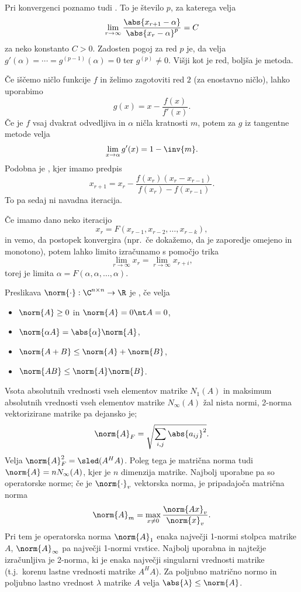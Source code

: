 Pri konvergenci poznamo tudi .
To je število $p$, za katerega velja
\[
  \lim_{r \to \infty} \frac{\abs{x_{r+1} - \alpha}}{\abs{x_r - \alpha}^{p}} = C
\]
za neko konstanto $C > 0$.
Zadosten pogoj za red $p$ je, da velja $g'(\alpha) = \cdots = g^{(p-1)}(\alpha)
= 0$ ter $g^{(p)} \ne 0$.
Višji kot je red, boljša je metoda.

Če iščemo ničlo funkcije $f$ in želimo zagotoviti red $2$ (za enostavno ničlo),
lahko uporabimo 
\[
  g(x) = x - \frac{f(x)}{f'(x)}.
\]
Če je $f$ vsaj dvakrat odvedljiva in $\alpha$ ničla kratnosti $m$, potem za $g$
iz tangentne metode velja
\[
  \lim_{x \to \alpha} g'(x) = 1 - \inv{m}.
\]
Podobna je , kjer imamo predpis
\[
  x_{r+1} = x_r - \frac{f(x_r) (x_r - x_{r-1})}{f(x_r) - f(x_{r-1})}.
\]
To pa sedaj ni navadna iteracija.

Če imamo dano neko iteracijo
\[
  x_r = F(x_{r-1}, x_{r-2}, \ldots, x_{r-k}),
\]
in vemo, da postopek konvergira (npr.~če dokažemo, da je zaporedje omejeno in
monotono), potem lahko limito izračunamo s pomočjo trika
\[
  \lim_{r \to \infty} x_r = \lim_{r \to \infty} x_{r+i},
\]
torej je limita $\alpha = F(\alpha, \alpha, \ldots, \alpha)$.


\begin{definicija}
  Preslikava $\norm{\cdot} : \C^{n \times n} \to \R$ je ,
  če velja
  \begin{itemize}
  \item $\norm{A} \ge 0$ in $\norm{A} = 0 \nt A = 0$,
  \item $\norm{\alpha A} = \abs{\alpha} \norm{A}$,
  \item $\norm{A + B} \le \norm{A} + \norm{B}$,
  \item $\norm{A B} \le \norm{A} \norm{B}$.
  \end{itemize}
\end{definicija}

Vsota absolutnih vrednosti vseh elementov matrike $N_1(A)$ in maksimum
absolutnih vrednosti vseh elementov matrike $N_\infty(A)$ žal nista normi,
2-norma vektorizirane matrike pa dejansko je;
\[
  \norm{A}_F = \sqrt{\sum_{i,j} \abs{a_{ij}}^2}.
\]
Velja $\norm{A}_F^2 = \sled (A^H A)$.
Poleg tega je matrična norma tudi $\norm{A} = n N_\infty(A)$, kjer je $n$
dimenzija matrike.
Najbolj uporabne pa so operatorske norme; če je $\norm{\cdot}_v$ vektorska
norma, je pripadajoča matrična norma
\[
  \norm{A}_m = \max_{x \ne 0} \frac{\norm{Ax}_v}{\norm{x}_v}.
\]
Pri tem je operatorska norma $\norm{A}_1$ enaka največji 1-normi stolpca matrike
$A$, $\norm{A}_\infty$ pa največji 1-normi vrstice.
Najbolj uporabna in najtežje izračunljiva je 2-norma, ki je enaka največji
singularni vrednosti matrike (t.j.~korenu lastne vrednosti matrike $A^H A$).
Za poljubno matrično normo in poljubno lastno vrednost $\lambda$ matrike $A$
velja $\abs{\lambda} \le \norm{A}$.

